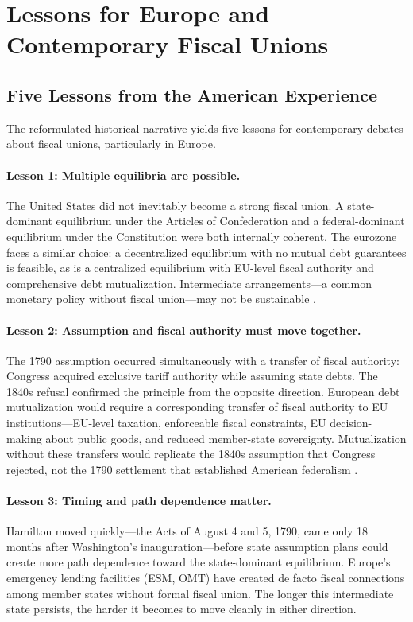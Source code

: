 \documentclass[12pt]{article}
\begin{document}
\section{Lessons for Europe and Contemporary Fiscal Unions}
\label{sec:europe}

\subsection{Five Lessons from the American Experience}

The reformulated historical narrative yields five lessons for
contemporary debates about fiscal unions, particularly in Europe.

\paragraph{Lesson 1: Multiple equilibria are possible.}
The United States did not inevitably become a strong fiscal union. A
state-dominant equilibrium under the Articles of Confederation and a
federal-dominant equilibrium under the Constitution were both internally
coherent. The eurozone faces a similar choice: a decentralized
equilibrium with no mutual debt guarantees is feasible, as is a
centralized equilibrium with EU-level fiscal authority and comprehensive
debt mutualization. Intermediate arrangements---a common monetary policy
without fiscal union---may not be sustainable
\citep{DeGrauwe2011}.

\paragraph{Lesson 2: Assumption and fiscal authority must move together.}
The 1790 assumption occurred simultaneously with a transfer of fiscal
authority: Congress acquired exclusive tariff authority while assuming
state debts. The 1840s refusal confirmed the principle from the opposite
direction. European debt mutualization would require a corresponding
transfer of fiscal authority to EU institutions---EU-level taxation,
enforceable fiscal constraints, EU decision-making about public goods,
and reduced member-state sovereignty. Mutualization without these
transfers would replicate the 1840s assumption that Congress rejected,
not the 1790 settlement that established American federalism
\citep[ch.~4]{BrunnermeierJamesLandau2016}.

\paragraph{Lesson 3: Timing and path dependence matter.}
Hamilton moved quickly---the Acts of August 4 and 5, 1790, came only 18
months after Washington's inauguration---before state assumption plans
could create more path dependence toward the state-dominant equilibrium.
Europe's emergency lending facilities (ESM, OMT) have created de facto
fiscal connections among member states without formal fiscal union. The
longer this intermediate state persists, the harder it becomes to move
cleanly in either direction.
\end{document}
